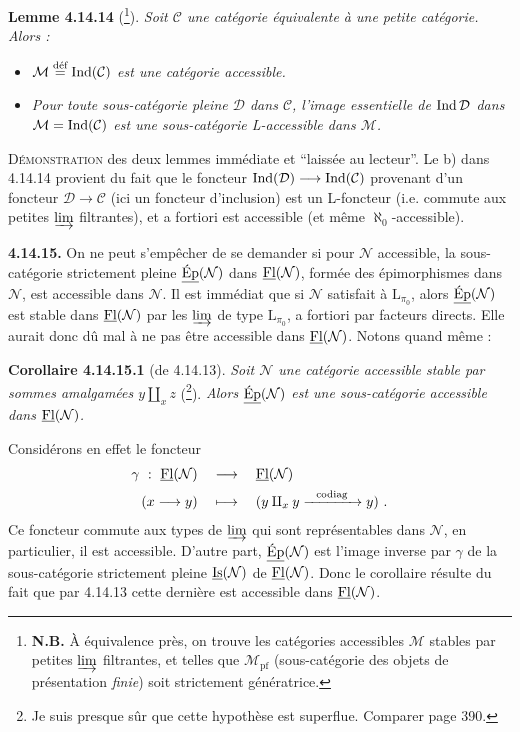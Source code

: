 \textbf{Lemme 4.14.14} (\footnote[166]{\textbf{N.B.} À équivalence près, on trouve les catégories accessibles $\mathcal{M}$ stables par petites $\varinjlim$ filtrantes, et telles que $\mathcal{M}_{\mathrm{pf}}$ (sous-catégorie des objets de présentation \textit{finie}) soit strictement génératrice.}). \textit{Soit $\mathcal{C}$ une catégorie équivalente à une petite catégorie. Alors :}
\begin{itemize}[nosep]
\item[\textit{a)}] \textit{$\mathcal{M} \defeq \Ind(\mathcal{C})$ est une catégorie accessible.}
\item[\textit{b)}] \textit{Pour toute sous-catégorie pleine $\mathcal{D}$ dans $\mathcal{C}$, l'image essentielle de $\Ind\mathcal{D}$ dans $\mathcal{M} = \Ind(\mathcal{C})$ est une sous-catégorie L-accessible dans $\mathcal{M}$.}
\end{itemize}
\textsc{Démonstration} des deux lemmes immédiate et ``laissée au lecteur''. Le b) dans 4.14.14 provient du fait que le foncteur $\Ind(\mathcal{D}) \longrightarrow \Ind(\mathcal{C})$ provenant d'un foncteur $\mathcal{D} \longrightarrow \mathcal{C}$ (ici un
foncteur d'inclusion) est un L-foncteur (i.e. commute aux petites $\varinjlim$ filtrantes), et a fortiori est accessible (et même $\aleph_0$-accessible).

\textbf{4.14.15.} On ne peut s'empêcher de se demander si pour $\mathcal{N}$ accessible, la sous-catégorie strictement pleine $\uEp(\mathcal{N})$ dans $\uFl(\mathcal{N})$, formée des épimorphismes dans $\mathcal{N}$, est accessible dans $\mathcal{N}$. Il est immédiat que si $\mathcal{N}$ satisfait à $\mathrm{L}_{\pi_0}$, alors $\uEp(\mathcal{N})$ est stable dans $\uFl(\mathcal{N})$ par les $\varinjlim$ de type $\mathrm{L}_{\pi_0}$, a fortiori par facteurs directs. Elle aurait donc dû mal à ne pas être accessible dans $\uFl(\mathcal{N})$. Notons quand même : %

\textbf{Corollaire 4.14.15.1} (de 4.14.13). \textit{Soit $\mathcal{N}$ une catégorie accessible stable par sommes amalgamées $y \amalg_x z$} (\footnote[167]{Je suis presque sûr que cette hypothèse est superflue. Comparer page 390.}). \textit{Alors $\uEp(\mathcal{N})$ est une sous-catégorie accessible dans $\uFl(\mathcal{N})$.}


Considérons en effet le foncteur
\[
\begin{aligned}
\gamma \ : \ \uFl(\mathcal{N}) \quad &\longrightarrow \quad \uFl(\mathcal{N}) \\
(x \longrightarrow y) \quad &\longmapsto \quad (y \amalg_x y \xrightarrow{\ \ \text{codiag}\ \ } y) \ .
\end{aligned}
\]
Ce foncteur commute aux types de $\varinjlim$ qui sont représentables dans $\mathcal{N}$, en particulier, il est accessible. D'autre part, $\uEp(\mathcal{N})$ est l'image inverse par $\gamma$ de la sous-catégorie strictement pleine $\uIs(\mathcal{N})$ de $\uFl(\mathcal{N})$. Donc le corollaire résulte du fait que par 4.14.13 cette dernière est accessible dans $\uFl(\mathcal{N})$.

